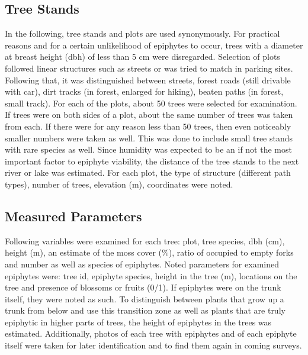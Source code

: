 \documentclass[12pt, a4paper,oneside]{article}
\begin{document}
\subsection{Tree Stands}
In the following, tree stands and plots are used synonymously. For practical reasons and for a certain unlikelihood of epiphytes to occur, trees with a diameter at breast height (dbh) of less than 5 cm were disregarded. Selection of plots followed linear structures such as streets or was tried to match in parking sites. Following that, it was distinguished between streets, forest roads (still drivable with car), dirt tracks (in forest, enlarged for hiking), beaten paths (in forest, small track). For each of the plots, about 50 trees were selected for examination. If trees were on both sides of a plot, about the same number of trees was taken from each. If there were for any reason less than 50 trees, then even noticeably smaller numbers were taken as well. This was done to include small tree stands with rare species as well. Since humidity was expected to be an if not the most important factor to epiphyte viability, the distance of the tree stands to the next river or lake was estimated. For each plot, the type of structure (different path types), number of trees, elevation (m), coordinates were noted.

\subsection{Measured Parameters}
Following variables were examined for each tree: plot, tree species, dbh (cm), height (m), an estimate of the moss cover (\%), ratio of occupied to empty forks and number as well as species of epiphytes. Noted parameters for examined epiphytes were: tree id, epiphyte species, height in the tree (m), locations on the tree  and presence of blossoms or fruits (0/1). If epiphytes were on the trunk itself, they were noted as such. To distinguish between plants that grow up a trunk from below and use this transition zone as well as plants that are truly epiphytic in higher parts of trees, the height of epiphytes in the trees was estimated. Additionally, photos of each tree with epiphytes and of each epiphyte itself were taken for later identification and to find them again in coming surveys.
\end{document}
